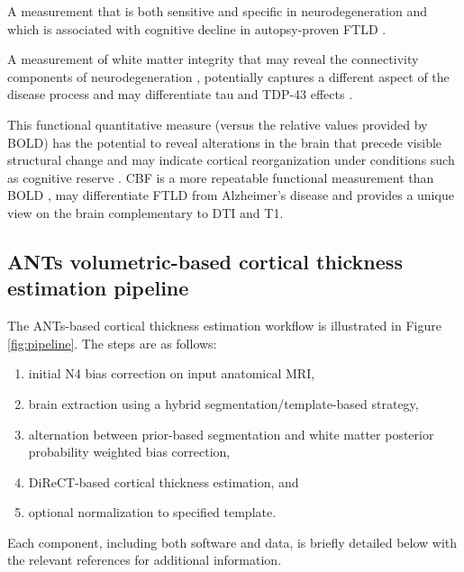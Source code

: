   A measurement that is both sensitive and specific in neurodegeneration \cite{} and which is associated with cognitive decline in autopsy-proven FTLD \cite{}.  %

  A measurement of white matter integrity that may reveal the connectivity components of neurodegeneration \cite{Zhang2009B}, potentially captures a different aspect of the disease process \cite{Englund2004JN} and may differentiate tau and TDP-43 effects \cite{McMillan2013JNNP}.    

  This functional quantitative measure (versus the relative values provided by BOLD) has the potential to reveal alterations in the brain that precede visible structural change and may indicate cortical reorganization under conditions such as cognitive reserve \cite{}.  
CBF is a more repeatable functional measurement than BOLD \cite{}, may differentiate FTLD from Alzheimer's disease \cite{} and provides a unique view on the brain complementary to DTI and T1.  

\subsection{ANTs volumetric-based cortical thickness estimation pipeline}

The ANTs-based cortical thickness estimation workflow is illustrated 
in Figure \ref{fig:pipeline}.  The steps are as follows:
\begin{enumerate}
  \item initial N4 bias correction on input anatomical MRI,
  \item brain extraction using a hybrid segmentation/template-based strategy,
  \item alternation between prior-based segmentation and white matter posterior
        probability weighted bias correction,
  \item DiReCT-based cortical thickness estimation, and
  \item optional normalization to specified template.
\end{enumerate}
Each component, including both software and data, is briefly detailed 
below with the relevant references for additional information. 


